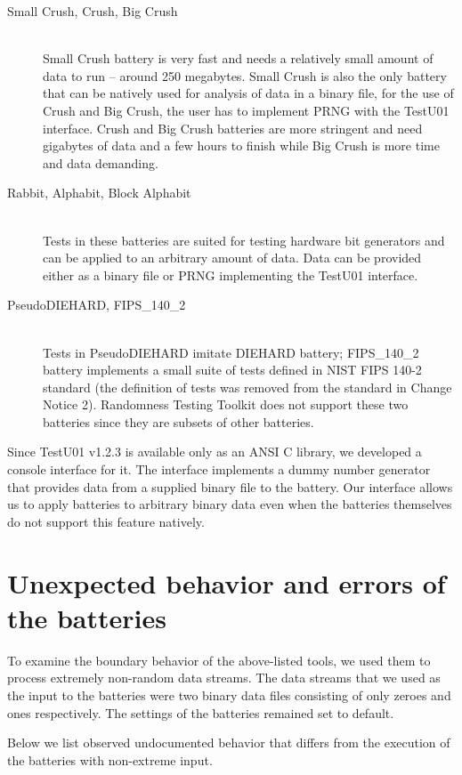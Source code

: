 \documentclass[
	digital,    %
	oneside,    %
	color,
	11pt,
	nocover,
	notable,
	nolof,
	nolot,
]{fithesis3}
\theoremstyle{definition}
\theoremstyle{remark}
\begin{document}
\begin{description}
\item[Small Crush, Crush, Big Crush] \hfill \\
Small Crush battery is very fast and needs a relatively small amount of data to run -- around 250 megabytes. Small Crush is also the only battery that can be natively used for analysis of data in a binary file, for the use of Crush and Big Crush, the user has to implement PRNG with the TestU01 interface. Crush and Big Crush batteries are more stringent and need gigabytes of data and a few hours to finish while Big Crush is more time and data demanding.
\item[Rabbit, Alphabit, Block Alphabit] \hfill \\
Tests in these batteries are suited for testing hardware bit generators and can be applied to an arbitrary amount of data. Data can be provided either as a binary file or PRNG implementing the TestU01 interface.
\item[PseudoDIEHARD, FIPS\_140\_2] \hfill \\
Tests in PseudoDIEHARD imitate DIEHARD battery; FIPS\_140\_2 battery implements a small suite of tests defined in NIST FIPS 140-2 standard \cite{nist-fips-140-2} (the definition of tests was removed from the standard in Change Notice 2). Randomness Testing Toolkit does not support these two batteries since they are subsets of other batteries.
\end{description}

Since TestU01 v1.2.3 is available only as an ANSI C library, we developed a console interface for it. The interface implements a dummy number generator that provides data from a supplied binary file to the battery. Our interface allows us to apply batteries to arbitrary binary data even when the batteries themselves do not support this feature natively.

\section{Unexpected behavior and errors of the batteries}
To examine the boundary behavior of the above-listed tools, we used them to process extremely non-random data streams. The data streams that we used as the input to the batteries were two binary data files consisting of only zeroes and ones respectively. The settings of the batteries remained set to default. 

Below we list observed undocumented behavior that differs from the execution of the batteries with non-extreme input.
\end{document}
